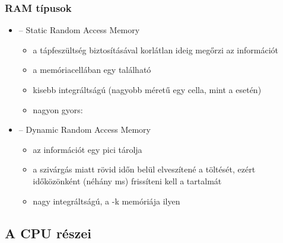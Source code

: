 \documentclass[../main.tex]{subfiles}
\begin{document}
\subsubsection*{RAM típusok}

\begin{itemize}
  \item {} \tabto{1.7cm} – \tabto{2.5cm}
        Static Random Access Memory
        \begin{itemize}
          \item  a tápfeszültség biztosításával korlátlan
                ideig megőrzi az információt

          \item a memóriacellában egy  található

          \item kisebb integráltságú
                (nagyobb méretű egy cella, mint a  esetén)

          \item nagyon gyors: 
        \end{itemize}

  \item {} \tabto{1.7cm} – \tabto{2.5cm}
        Dynamic Random Access Memory
        \begin{itemize}
          \item az információt egy pici
                 tárolja

          \item a szivárgás miatt rövid időn belül elveszítené a töltését,
                ezért időközönként (néhány ms) frissíteni kell a tartalmát

          \item nagy integráltságú, a -k memóriája ilyen
        \end{itemize}
\end{itemize}

\subsection{A CPU részei}
\end{document}
